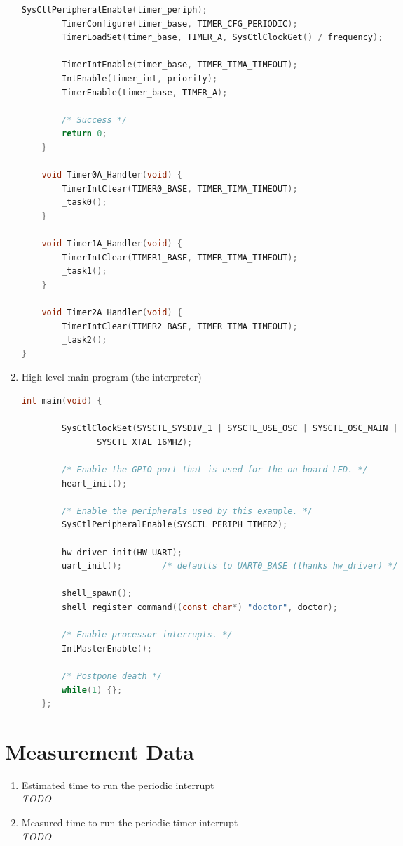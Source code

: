 \documentclass[12pt]{article}
\newcommand{\todo}{{\LARGE \emph{\color{red}TODO}}}
\begin{document}
\begin{enumerate}[1)]
\begin{lstlisting}[language=C]
        SysCtlPeripheralEnable(timer_periph);
        TimerConfigure(timer_base, TIMER_CFG_PERIODIC);
        TimerLoadSet(timer_base, TIMER_A, SysCtlClockGet() / frequency);

        TimerIntEnable(timer_base, TIMER_TIMA_TIMEOUT);
        IntEnable(timer_int, priority);
        TimerEnable(timer_base, TIMER_A);

        /* Success */
        return 0;
    }

    void Timer0A_Handler(void) {
        TimerIntClear(TIMER0_BASE, TIMER_TIMA_TIMEOUT);
        _task0();
    }

    void Timer1A_Handler(void) {
        TimerIntClear(TIMER1_BASE, TIMER_TIMA_TIMEOUT);
        _task1();
    }

    void Timer2A_Handler(void) {
        TimerIntClear(TIMER2_BASE, TIMER_TIMA_TIMEOUT);
        _task2();
}
  \end{lstlisting}
\item High level main program (the interpreter) \\
  \begin{lstlisting}[language=C]
    int main(void) {

        SysCtlClockSet(SYSCTL_SYSDIV_1 | SYSCTL_USE_OSC | SYSCTL_OSC_MAIN |
    		   SYSCTL_XTAL_16MHZ);

        /* Enable the GPIO port that is used for the on-board LED. */
        heart_init();

        /* Enable the peripherals used by this example. */
        SysCtlPeripheralEnable(SYSCTL_PERIPH_TIMER2);

        hw_driver_init(HW_UART);
        uart_init();		/* defaults to UART0_BASE (thanks hw_driver) */

        shell_spawn();
        shell_register_command((const char*) "doctor", doctor);

        /* Enable processor interrupts. */
        IntMasterEnable();

        /* Postpone death */
        while(1) {};
    };
  \end{lstlisting}
\end{enumerate}
\section{Measurement Data}
\begin{enumerate}[1)]
  \item Estimated time to run the periodic interrupt \\ \todo
  \item Measured time to run the periodic timer interrupt \\ \todo
  \end{enumerate}
\end{document}
